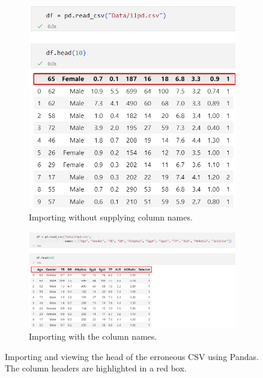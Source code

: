 \documentclass[12pt]{report}
\begin{document}
\begin{figure}[H]
    \centering
    \begin{subfigure}{0.75\textwidth}
       \includegraphics[width=1\linewidth]{pandasNoNames.png}
       \caption{Importing without supplying column names.}
       \label{fig:pandasNames} 
    \end{subfigure}
    
    \begin{subfigure}{1\textwidth}
       \includegraphics[width=1\linewidth]{pandasNames.png}
       \caption{Importing with the column names.}
       \label{fig:PN2}
    \end{subfigure}
    \caption{Importing and viewing the head of the erroneous CSV using Pandas. The column headers are highlighted in a red box.}
\end{figure}
\end{document}
